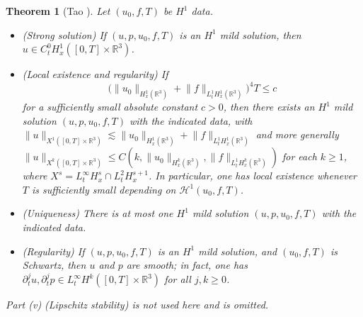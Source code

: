 \documentclass[11pt]{article}
\newtheorem{theorem}{Theorem}[section]
\theoremstyle{definition}
\theoremstyle{plain}
\newcommand{\R}{\mathbb R}
\newcommand{\norm}[1]{\lVert #1\rVert}
\begin{document}
\begin{theorem}[Tao {\cite[Theorem~5.4, pp.~52--53]{Tao2013}}]
\label{thm:tao54}
Let $(u_0,f,T)$ be $H^1$ data.
\begin{itemize}
\item[(i)] (Strong solution) If $(u,p,u_0,f,T)$ is an $H^1$ mild solution,
then $u\in C^0_tH^1_x([0,T]\times\R^3)$.
\item[(ii)] (Local existence and regularity) If
\[
 \bigl(\norm{u_0}_{H^1_x(\R^3)}+\norm f_{L^1_tH^1_x(\R^3)}\bigr)^4T\leq c
\]
for a sufficiently small absolute constant $c>0$, then there exists an
$H^1$ mild solution $(u,p,u_0,f,T)$ with the indicated data, with
$\norm u_{X^1([0,T]\times\R^3)}\lesssim\norm{u_0}_{H^1_x(\R^3)}+
\norm f_{L^1_tH^1_x(\R^3)}$ and more generally
$\norm u_{X^k([0,T]\times\R^3)}\leq C(k,\norm{u_0}_{H^k_x(\R^3)},
\norm f_{L^1_tH^k_x(\R^3)})$ for each $k\geq1$, where
$X^s=L^\infty_tH^s_x\cap L^2_tH^{s+1}_x$.  In particular, one has local
existence whenever $T$ is sufficiently small depending on
$\mathcal H^1(u_0,f,T)$.
\item[(iii)] (Uniqueness) There is at most one $H^1$ mild solution
$(u,p,u_0,f,T)$ with the indicated data.
\item[(iv)] (Regularity) If $(u,p,u_0,f,T)$ is an $H^1$ mild solution,
and $(u_0,f,T)$ is Schwartz, then $u$ and $p$ are smooth; in fact, one has
$\partial_t^ju,\partial_t^jp\in L^\infty_tH^k([0,T]\times\R^3)$ for all
$j,k\geq0$.
\end{itemize}
Part (v) (Lipschitz stability) is not used here and is omitted.
\end{theorem}
\end{document}
